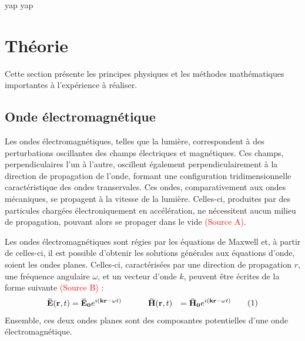 \documentclass[11pt,letterpaper]{article}
\begin{document}
yap yap

\section{Théorie}
Cette section présente les principes physiques et les méthodes mathématiques importantes à l'expérience à réaliser.

\subsection{Onde électromagnétique}
Les ondes électromagnétiques, telles que la lumière, correspondent à des perturbations oscillantes des champs électriques et magnétiques. Ces champs, perpendiculaires l'un à l'autre, oscillent également perpendiculairement à la direction de propagation de l'onde, formant une configuration tridimensionnelle caractéristique des ondes transervales. Ces ondes, comparativement aux ondes mécaniques, se propagent à la vitesse de la lumière. Celles-ci, produites par des particules chargées électroniquement en accélération, ne nécessitent aucun milieu de propagation, pouvant alors se propager dans le vide \textcolor{red}{(Source A)}.

Les ondes électromagnétiques sont régies par les équations de Maxwell et, à partir de celles-ci, il est possible d'obtenir les solutions générales aux équations d'onde, soient les ondes planes. Celles-ci, caractérisées par une direction de propagation $r$, une fréquence angulaire $\omega$, et un vecteur d'onde $k$, peuvent être écrites de la forme suivante \textcolor{red}{(Source B)} :
\begin{equation}
  \begin{aligned}
  \mathbf{\Bar{E}}(\textbf{r},t)&=\mathbf{\Bar{E}_{0}}e^{i(\mathbf{kr}-\omega t)} & \;\;\;\;\;\;\;\; & \mathbf{\Bar{H}}(\mathbf{r},t)&=\mathbf{\Bar{H}_{0}}e^{i(\mathbf{kr}-\omega t)} \\
  \end{aligned}
  \tag{1}
\end{equation}
Ensemble, ces deux ondes planes sont des composantes potentielles d'une onde électromagnétique.

\end{document}

